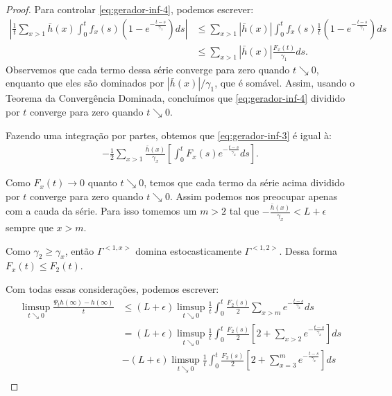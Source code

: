 \begin{proof}
  Para controlar \eqref{eq:gerador-inf-4}, podemos escrever:
  \begin{align*}
    \left| \frac{1}{t} \sum_{x > 1} \bar{h}(x) \int_0^t f_x (s) \left(
        1 - e^{-\frac{t-s}{\gamma_1}}
      \right) d s \right| &\leq
  \sum_{x > 1} |\bar{h}(x)| \int_0^t f_x (s) \frac{1}{t}\left(
    1 - e^{-\frac{t-s}{\gamma_1}}
  \right) d s \\
  & \leq \sum_{x > 1} |\bar{h}(x)| \frac{F_x(t)}{\gamma_1} d s  .
  \end{align*}
  Observemos que cada termo dessa série converge para zero quando $t
  \searrow 0$, enquanto que eles são dominados por $|\bar{h}(x)| /
  \gamma_1$, que é somável. Assim, usando o Teorema da Convergência
  Dominada, concluímos que \eqref{eq:gerador-inf-4} dividido por
  $t$ converge para zero quando $t \searrow 0$.

  Fazendo uma integração por partes, obtemos que
  \eqref{eq:gerador-inf-3} é igual à:
  \begin{align*}
    - \frac{1}{2} \sum_{x > 1} \frac{\bar{h}(x)}{\gamma_x} \left[
      \int_0^t F_x (s) e^{-\frac{t-s}{\gamma_x}} ds
    \right].
  \end{align*}

  Como $F_x(t) \to 0$ quanto $t \searrow 0$, temos que cada termo da
  série acima dividido por $t$ converge para zero quando $t \searrow
  0$. Assim podemos nos preocupar apenas com a cauda da série. Para
  isso tomemos um $m > 2$ tal que $-\frac{\bar{h}(x)}{\gamma_x} < L +
  \epsilon$ sempre que $x > m$.

  Como $\gamma_2\geq \gamma_x$, então $\Gamma^{<1, x>}$ domina
  estocasticamente $\Gamma^{<1, 2>}$. Dessa forma $F_x(t) \leq
  F_2(t)$.

  Com todas essas considerações, podemos escrever:
  \begin{align*}
    \limsup_{t \searrow 0} \frac{\Psi_t h(\infty) - h(\infty)}{t}
    &\leq \left( L + \epsilon \right) \limsup_{t \searrow
      0}\frac{1}{t} \int_0^t \frac{F_2(s)}{2} \sum_{x >
      m}e^{-\frac{t-s}{\gamma_x}} ds\\
    &= \left( L + \epsilon \right) \limsup_{t \searrow
      0}\frac{1}{t} \int_0^t \frac{F_2(s)}{2} \left[
      2 + \sum_{x > 2} e^{-\frac{t-s}{\gamma_x}}
    \right] ds\\
    &- \left( L + \epsilon \right) \limsup_{t \searrow
      0}\frac{1}{t} \int_0^t \frac{F_2(s)}{2} \left[
      2 + \sum_{x=3}^m e^{-\frac{t-s}{\gamma_x}}
    \right] ds\\
  \end{align*}


\end{proof}

